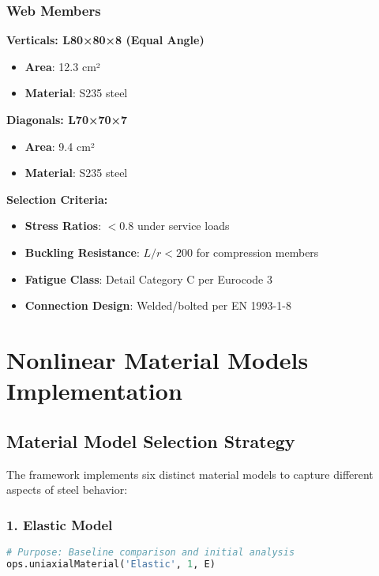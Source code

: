 \documentclass[12pt,a4paper]{article}
\begin{document}
\subsubsection{Web Members}

\textbf{Verticals: L80×80×8 (Equal Angle)}
\begin{itemize}
    \item \textbf{Area}: 12.3 cm²
    \item \textbf{Material}: S235 steel
\end{itemize}

\textbf{Diagonals: L70×70×7}
\begin{itemize}
    \item \textbf{Area}: 9.4 cm²
    \item \textbf{Material}: S235 steel
\end{itemize}

\textbf{Selection Criteria:}
\begin{itemize}
    \item \textbf{Stress Ratios}: $<0.8$ under service loads
    \item \textbf{Buckling Resistance}: $L/r < 200$ for compression members
    \item \textbf{Fatigue Class}: Detail Category C per Eurocode 3
    \item \textbf{Connection Design}: Welded/bolted per EN 1993-1-8
\end{itemize}

\section{Nonlinear Material Models Implementation}

\subsection{Material Model Selection Strategy}

The framework implements six distinct material models to capture different aspects of steel behavior:

\subsubsection{1. Elastic Model}
\begin{lstlisting}[language=Python, caption=Elastic Material Model]
# Purpose: Baseline comparison and initial analysis
ops.uniaxialMaterial('Elastic', 1, E)
\end{lstlisting}
\end{document}
